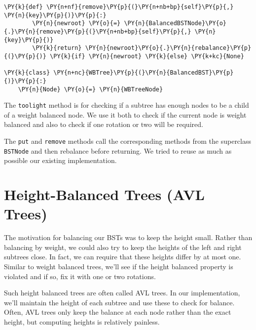 \begin{Verbatim}[commandchars=\\\{\}]
    \PY{k}{def} \PY{n+nf}{remove}\PY{p}{(}\PY{n+nb+bp}{self}\PY{p}{,} \PY{n}{key}\PY{p}{)}\PY{p}{:}
        \PY{n}{newroot} \PY{o}{=} \PY{n}{BalancedBSTNode}\PY{o}{.}\PY{n}{remove}\PY{p}{(}\PY{n+nb+bp}{self}\PY{p}{,} \PY{n}{key}\PY{p}{)}
        \PY{k}{return} \PY{n}{newroot}\PY{o}{.}\PY{n}{rebalance}\PY{p}{(}\PY{p}{)} \PY{k}{if} \PY{n}{newroot} \PY{k}{else} \PY{k+kc}{None}

\PY{k}{class} \PY{n+nc}{WBTree}\PY{p}{(}\PY{n}{BalancedBST}\PY{p}{)}\PY{p}{:}
    \PY{n}{Node} \PY{o}{=} \PY{n}{WBTreeNode}
\end{Verbatim}



The \texttt{toolight} method is for checking if a subtree has enough nodes to be a child of a weight balanced node.
We use it both to check if the current node is weight balanced and also to check if one rotation or two will be required.


The \texttt{put} and \texttt{remove} methods call the corresponding methods from the superclass \texttt{BSTNode} and then rebalance before returning.
We tried to reuse as much as possible our existing implementation.

\section{Height-Balanced Trees (AVL Trees)}


The motivation for balancing our BSTs was to keep the height small.
Rather than balancing by weight, we could also try to keep the heights of the left and right subtrees close.
In fact, we can require that these heights differ by at most one.
Similar to weight balanced trees, we'll see if the height balanced property is violated and if so, fix it with one or two rotations.


Such height balanced trees are often called AVL trees.
In our implementation, we'll maintain the height of each subtree and use these to check for balance.
Often, AVL trees only keep the balance at each node rather than the exact height, but computing heights is relatively painless.

